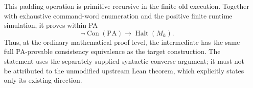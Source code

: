This padding operation is primitive recursive in the finite old execution.
Together with exhaustive command-word enumeration and the positive finite
runtime simulation, it proves within PA
\[
  \neg\operatorname{Con}(\mathrm{PA})
       \longrightarrow\operatorname{Halt}(M_h).
\]
Thus, at the ordinary mathematical proof level, the intermediate has the
same full PA-provable consistency equivalence as the target construction.
The statement uses the separately supplied syntactic converse argument;
it must not be attributed to the unmodified upstream Lean theorem, which
explicitly states only its existing direction.
